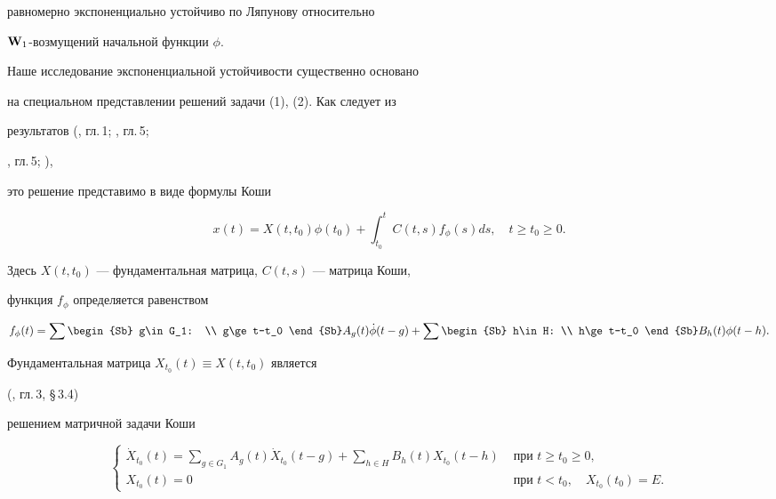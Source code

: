 равномерно экспоненциально устойчиво по Ляпунову относительно


$\bold W_1$-возмущений начальной функции $\phi$.





Наше исследование экспоненциальной устойчивости существенно основано


на специальном представлении решений задачи (1), (2). Как следует из


результатов (\cite{Kol}, гл.\,1; \cite{Ku1}, гл.\,5;


\cite{Az1}, гл.\,5; \cite{Az2}),


это решение представимо в виде формулы Коши


%


\begin{equation}


x(t)=X(t,t_0)\phi(t_0)+\int_{t_0}^tC(t,s)f_\phi(s)ds,\quad t\ge


t_0\ge0.


\end{equation}


%


Здесь $X(t,t_0)$ --- фундаментальная матрица, $C(t,s)$ --- матрица Коши,


функция $f_\phi$ определяется равенством


$$


f_\phi(t)=\sum


\begin{Sb}


g\in G_1: \\ g\ge t-t_0


\end{Sb}


A_g(t)\Dot\phi(t-g)+\sum


\begin{Sb}


h\in H: \\ h\ge t-t_0


\end{Sb}


B_h(t)\phi(t-h).


$$


Фундаментальная матрица $X_{t_0}(t)\equiv X(t,t_0)$ является


(\cite{Az1}, гл.\,3, \S\,3.4)


решением матричной задачи Коши


%


\begin{equation}


\begin{cases}


\Dot X_{t_0}(t)=\sum\limits_{g\in G_1}A_g(t)\Dot


X_{t_0}(t-g)+\sum\limits_{h\in


H}B_h(t)X_{t_0}(t-h) &\text{ при }t\ge t_0\ge 0,\\


%


X_{t_0}(t)=0 &\text{ при }t<t_0,\quad X_{t_0}(t_0)=E.


\end{cases}


\end{equation}


